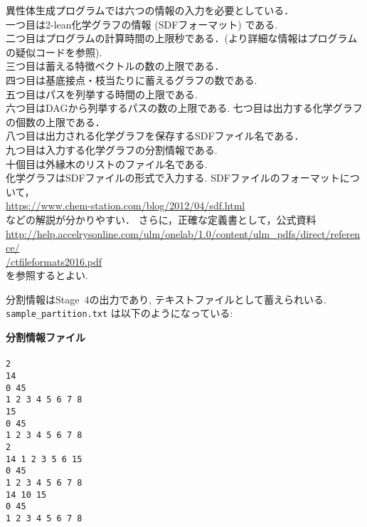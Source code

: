 \documentclass[11pt,titlepage,dvipdfmx,twoside]{jarticle}
\begin{document}
異性体生成プログラムでは六つの情報の入力を必要としている．\\
一つ目は2-lean化学グラフの情報 (SDFフォーマット) である.\\
二つ目はプログラムの計算時間の上限秒である．(より詳細な情報はプログラムの疑似コードを参照).\\
三つ目は蓄える特徴ベクトルの数の上限である．\\
四つ目は基底接点・枝当たりに蓄えるグラフの数である.\\
五つ目はパスを列挙する時間の上限である.\\
六つ目はDAGから列挙するパスの数の上限である.
七つ目は出力する化学グラフの個数の上限である．\\
八つ目は出力される化学グラフを保存するSDFファイル名である．\\
九つ目は入力する化学グラフの分割情報である. \\
十個目は外縁木のリストのファイル名である. \\



化学グラフはSDFファイルの形式で入力する.
SDFファイルのフォーマットについて，\\
\url{https://www.chem-station.com/blog/2012/04/sdf.html}\\
などの解説が分かりやすい．
さらに，正確な定義書として，公式資料 \\
\url{ http://help.accelrysonline.com/ulm/onelab/1.0/content/ulm_pdfs/direct/reference/} \\
\url{/ctfileformats2016.pdf} \\
を参照するとよい.

分割情報はStage~4の出力であり, テキストファイルとして蓄えられいる. \\
{\tt sample\_partition.txt} 
は以下のようになっている: 
\begin{oframed}
{\bf 分割情報ファイル}\\\\
{\tt 2				\\
14              \\
0 45            \\
1 2 3 4 5 6 7 8 \\
15              \\
0 45            \\
1 2 3 4 5 6 7 8 \\
2               \\
14 1 2 3 5 6 15 \\
0 45            \\
1 2 3 4 5 6 7 8 \\
14 10 15        \\
0 45            \\
1 2 3 4 5 6 7 8 \\
}
\end{oframed}
\end{document}
